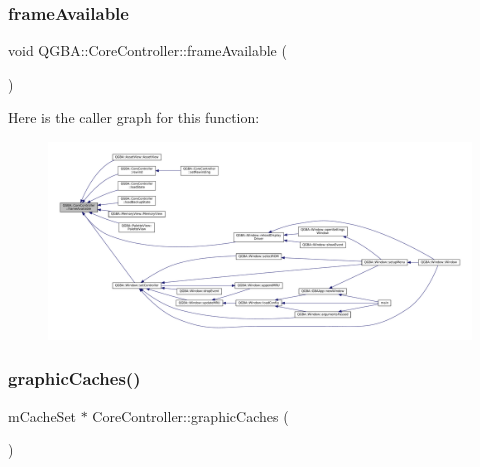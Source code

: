 \subsubsection{\texorpdfstring{frame\+Available}{frameAvailable}}
{\footnotesize\ttfamily void Q\+G\+B\+A\+::\+Core\+Controller\+::frame\+Available (\begin{DoxyParamCaption}{ }\end{DoxyParamCaption})\hspace{0.3cm}{\ttfamily [signal]}}

Here is the caller graph for this function\+:
\nopagebreak
\begin{figure}[H]
\begin{center}
\leavevmode
\includegraphics[width=350pt]{class_q_g_b_a_1_1_core_controller_a90f0018c959e53a889e14716971b9812_icgraph}
\end{center}
\end{figure}
\mbox{\label{class_q_g_b_a_1_1_core_controller_aaea9e7a9dc8177cd3f9e778ad81e45af}} 
\subsubsection{\texorpdfstring{graphic\+Caches()}{graphicCaches()}}
{\footnotesize\ttfamily m\+Cache\+Set $\ast$ Core\+Controller\+::graphic\+Caches (\begin{DoxyParamCaption}{ }\end{DoxyParamCaption})}

